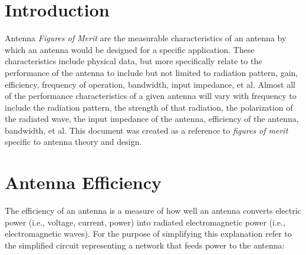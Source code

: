 \documentclass{article}
\begin{document}
\begin{titlepage}
    \maketitle
    \thispagestyle{empty}
    \newpage
\end{titlepage}

\tableofcontents
\listoffigures
\newpage

\section{Introduction}
Antenna \textit{Figures of Merit} are the measurable characteristics of an antenna by which an antenna would be designed for a specific application. These characteristics include physical data, but more specifically relate to the performance of the antenna to include but not limited to radiation pattern, gain, efficiency, frequency of operation, bandwidth, input impedance, et al. Almost all of the performance characteristics of a given antenna will vary with frequency to include the radiation pattern, the strength of that radiation, the polarization of the radiated wave, the input impedance of the antenna, efficiency of the antenna, bandwidth, et al. This document was created as a reference to \textit{figures of merit} specific to antenna theory and design.

\section{Antenna Efficiency}
The \gls{efficiency} of an antenna is a measure of how well an antenna converts electric power (i.e., voltage, current, power) into radiated electromagnetic power (i.e., electromagnetic waves). For the purpose of simplifying this explanation refer to the simplified circuit representing a network that feeds power to the antenna:
\end{document}
